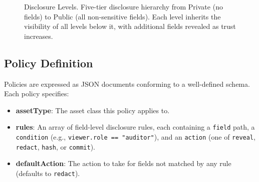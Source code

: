 \documentclass[conference]{IEEEtran}
\begin{document}
\begin{figure}[t]
\centering
{}
\caption{Disclosure Levels.  Five-tier disclosure hierarchy from Private (no
  fields) to Public (all non-sensitive fields).  Each level inherits the
  visibility of all levels below it, with additional fields revealed as trust
  increases.}
\label{fig:disclosure}
\end{figure}

\subsection{Policy Definition}

Policies are expressed as JSON documents conforming to a well-defined schema.
Each policy specifies:
\begin{itemize}
  \item \textbf{assetType}: The asset class this policy applies to.
  \item \textbf{rules}: An array of field-level disclosure rules, each
        containing a \texttt{field} path, a \texttt{condition} (e.g.,
        \texttt{viewer.role == "auditor"}), and an \texttt{action} (one of
        \texttt{reveal}, \texttt{redact}, \texttt{hash}, or
        \texttt{commit}).
  \item \textbf{defaultAction}: The action to take for fields not matched by
        any rule (defaults to \texttt{redact}).
\end{itemize}
\end{document}

